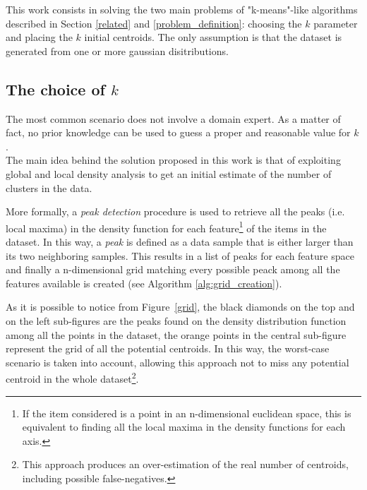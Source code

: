 This work consists in solving the two main problems of "k-means"-like 
algorithms described in Section \ref{related} and \ref{problem_definition}:
choosing the $k$ parameter and placing the $k$ initial centroids.
The only assumption is that the dataset is generated from one or more gaussian
disitributions.


\subsection{The choice of $k$}
The most common scenario does not involve a domain expert. As a matter of fact, 
no prior knowledge can be used to guess a proper and reasonable value for $k$.\\
The main idea behind the solution proposed in this work is that of exploiting global
and local density analysis to get an initial estimate of the number of clusters
in the data.

More formally, a \emph{peak detection} procedure is used to retrieve 
all the peaks (i.e. local maxima) in the density function for each feature\footnote{If
the item considered is a point in an n-dimensional euclidean space, this is equivalent to
finding all the local maxima in the density functions for each axis.} of the items in 
the dataset. In this way, a \emph{peak} is defined as a data sample that is either larger than 
its two neighboring samples.
This results in a list of peaks for each feature space and finally a n-dimensional grid
matching every possible peack among all the features available is created
(see Algorithm \ref{alg:grid_creation}).


As it is possible to notice from Figure~\ref{grid}, the black diamonds on the top and on
the left sub-figures are the peaks found on the density distribution function among all
the points in the dataset, the orange points in the central sub-figure represent the
grid of all the potential centroids.
In this way, the worst-case scenario is taken into account, allowing this approach not
to miss any potential centroid in the whole dataset\footnote{This approach produces an 
over-estimation of the real number of centroids, including possible false-negatives.}.

\begin{figure*}
  \caption{The grid with all the potential centroids computed from the peaks.}
  \label{grid}
\end{figure*}

